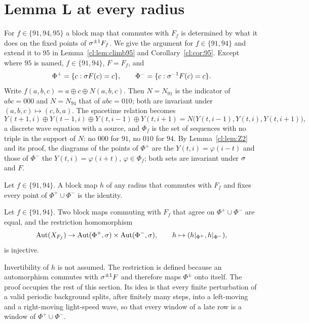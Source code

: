 \section{Lemma L at every radius}\label{cl:sec:light}

For $f\in\{91,94,95\}$ a block map that commutes with $F_f$ is determined by what it does on the fixed points of $\sigma^{\pm1}F_f$. We give the argument for $f\in\{91,94\}$ and extend it to $95$ in Lemma~\ref{cl:lem:climb95} and Corollary~\ref{cl:cor:95}. Except where $95$ is named, $f\in\{91,94\}$, $F=F_f$, and
\[
\Phi^+=\{c:\sigma F(c)=c\},\qquad\Phi^-=\{c:\sigma^{-1}F(c)=c\}.
\]
Write $f(a,b,c)=a\oplus c\oplus N(a,b,c)$. Then $N=N_{91}$ is the indicator of $abc=000$ and $N=N_{94}$ that of $abc=010$; both are invariant under $(a,b,c)\mapsto(c,b,a)$. The spacetime relation becomes
\begin{equation}\label{cl:eq:wave}
Y(t+1,i)\oplus Y(t-1,i)\oplus Y(t,i-1)\oplus Y(t,i+1)=N\bigl(Y(t,i-1),Y(t,i),Y(t,i+1)\bigr),
\end{equation}
a discrete wave equation with a source, and $\Phi_f$ is the set of sequences with no triple in the support of $N$: no $000$ for $91$, no $010$ for $94$. By Lemma~\ref{cl:lem:Z2} and its proof, the diagrams of the points of $\Phi^+$ are the $Y(t,i)=\varphi(i-t)$ and those of $\Phi^-$ the $Y(t,i)=\varphi(i+t)$, $\varphi\in\Phi_f$; both sets are invariant under $\sigma$ and $F$.

\begin{theorem}[Lemma L]\label{cl:thm:L}
Let $f\in\{91,94\}$. A block map $h$ of any radius that commutes with $F_f$ and fixes every point of $\Phi^+\cup\Phi^-$ is the identity.
\end{theorem}

\begin{corollary}\label{cl:cor:res}
Let $f\in\{91,94\}$. Two block maps commuting with $F_f$ that agree on $\Phi^+\cup\Phi^-$ are equal, and the restriction homomorphism
\[
\operatorname{Aut}(X_{F_f})\to\operatorname{Aut}(\Phi^+,\sigma)\times\operatorname{Aut}(\Phi^-,\sigma),\qquad h\mapsto(h|_{\Phi^+},h|_{\Phi^-}),
\]
is injective.
\end{corollary}

Invertibility of $h$ is not assumed. The restriction is defined because an automorphism commutes with $\sigma^{\pm1}F$ and therefore maps $\Phi^\pm$ onto itself. The proof occupies the rest of this section. Its idea is that every finite perturbation of a valid periodic background splits, after finitely many steps, into a left-moving and a right-moving light-speed wave, so that every window of a late row is a window of $\Phi^+\cup\Phi^-$.

